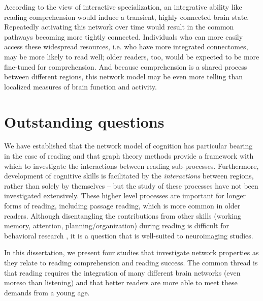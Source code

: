 According to the view of interactive specialization, an integrative ability like reading comprehension would induce a transient, highly connected brain state. Repeatedly activating this network over time would result in the common pathways becoming more tightly connected. Individuals who can more easily access these widespread resources, i.e. who have more integrated connectomes, may be more likely to read well; older readers, too, would be expected to be more fine-tuned for comprehension. And because comprehension is a shared process between different regions, this network model may be even more telling than localized measures of brain function and activity. 


\section{Outstanding questions}

We have established that the network model of cognition has particular bearing in the case of reading and that graph theory methods provide a framework with which to investigate the interactions between reading sub-processes. Furthermore, development of cognitive skills is facilitated by the \textit{interactions} between regions, rather than solely by themselves -- but the study of these processes have not been investigated extensively. These higher level processes are important for longer forms of reading, including passage reading, which is more common in older readers. Although disentangling the contributions from other skills (working memory, attention, planning/organization) during reading is difficult for behavioral research \citep{Cain2006}, it is a question that is well-suited to neuroimaging studies. 

In this dissertation, we present four studies that investigate network properties as they relate to reading comprehension and reading success. The common thread is that reading requires the integration of many different brain networks (even moreso than listening) and that better readers are more able to meet these demands from a young age.

